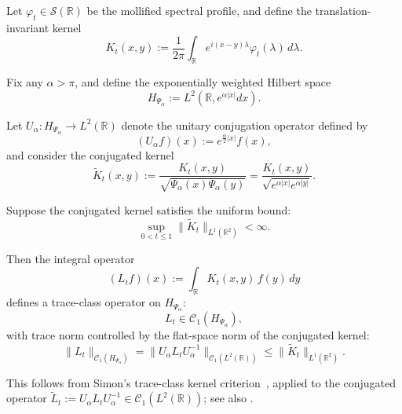 \begin{lemma}
\label{lem:trace_class_Lt}
Let \( \varphi_t \in \mathcal{S}(\mathbb{R}) \) be the mollified spectral profile, and define the translation-invariant kernel
\[
K_t(x, y) := \frac{1}{2\pi} \int_{\mathbb{R}} e^{i(x - y)\lambda} \varphi_t(\lambda)\, d\lambda.
\]

Fix any \( \alpha > \pi \), and define the exponentially weighted Hilbert space
\[
H_{\Psi_\alpha} := L^2(\mathbb{R}, e^{\alpha |x|} dx).
\]

Let \( U_\alpha : H_{\Psi_\alpha} \to L^2(\mathbb{R}) \) denote the unitary conjugation operator defined by
\[
(U_\alpha f)(x) := e^{\frac{\alpha}{2}|x|} f(x),
\]
and consider the conjugated kernel
\[
\widetilde{K}_t(x, y) := \frac{K_t(x, y)}{\sqrt{\Psi_\alpha(x)\Psi_\alpha(y)}}
= \frac{K_t(x, y)}{\sqrt{e^{\alpha |x|} e^{\alpha |y|}}}.
\]

Suppose the conjugated kernel satisfies the uniform bound:
\[
\sup_{0 < t \le 1} \| \widetilde{K}_t \|_{L^1(\mathbb{R}^2)} < \infty.
\]

Then the integral operator
\[
(L_t f)(x) := \int_{\mathbb{R}} K_t(x, y)\, f(y)\, dy
\]
defines a trace-class operator on \( H_{\Psi_\alpha} \):
\[
L_t \in \mathcal{C}_1(H_{\Psi_\alpha}),
\]
with trace norm controlled by the flat-space norm of the conjugated kernel:
\[
\| L_t \|_{\mathcal{C}_1(H_{\Psi_\alpha})}
= \| U_\alpha L_t U_\alpha^{-1} \|_{\mathcal{C}_1(L^2(\mathbb{R}))}
\le \| \widetilde{K}_t \|_{L^1(\mathbb{R}^2)}.
\]

This follows from Simon’s trace-class kernel criterion~\cite[Thm.~4.2]{Simon2005TraceIdeals}, applied to the conjugated operator \( \widetilde{L}_t := U_\alpha L_t U_\alpha^{-1} \in \mathcal{C}_1(L^2(\mathbb{R})) \); see also .
\end{lemma}
